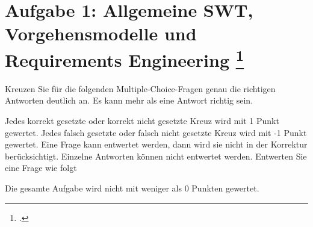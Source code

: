 \documentclass{bschlangaul-aufgabe}
\begin{document}

\section{Aufgabe 1: Allgemeine SWT, Vorgehensmodelle und Requirements
Engineering
\footcite[Thema 2 Teilaufgabe 1 Aufgabe 1]{examen:46116:2014:09}}

Kreuzen Sie für die folgenden Multiple-Choice-Fragen genau die richtigen
Antworten deutlich an. Es kann mehr als eine Antwort richtig sein.

Jedes korrekt gesetzte oder korrekt nicht gesetzte Kreuz wird mit 1
Punkt gewertet. Jedes falsch gesetzte oder falsch nicht gesetzte Kreuz
wird mit -1 Punkt gewertet. Eine Frage kann entwertet werden, dann wird
sie nicht in der Korrektur berücksichtigt. Einzelne Antworten können
nicht entwertet werden. Entwerten Sie eine Frage wie folgt

Die gesamte Aufgabe wird nicht mit weniger als 0 Punkten gewertet.
\end{document}
